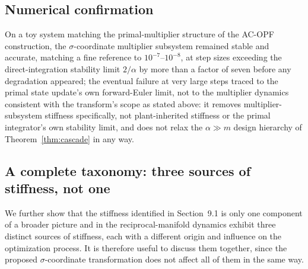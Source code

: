 \documentclass[11pt,onecolumn]{article}
\theoremstyle{definition}
\theoremstyle{remark}
\begin{document}
\subsection{Numerical confirmation}
On a toy system matching the primal-multiplier structure of the AC-OPF construction, the
$\sigma$-coordinate multiplier subsystem remained stable and accurate, matching a fine
reference to $10^{-7}$--$10^{-8}$, at step sizes exceeding the direct-integration stability
limit $2/\alpha$ by more than a factor of seven before any degradation appeared; the eventual
failure at very large steps traced to the primal state update's own forward-Euler limit, not to
the multiplier dynamics consistent with the transform's scope as stated above: it removes
multiplier-subsystem stiffness specifically, not plant-inherited stiffness or the primal
integrator's own stability limit, and does not relax the $\alpha \gg m$ design hierarchy of
Theorem~\ref{thm:cascade} in any way.



\subsection{A complete taxonomy: three sources of stiffness, not one}


We further show that the stiffness identified in Section~9.1 is only one component of a broader picture and in  the reciprocal-manifold dynamics exhibit three distinct sources of stiffness, each with a different origin and influence on the optimization process. It is therefore useful to discuss them together, since the proposed $\sigma$-coordinate transformation does not affect all of them in the same way.
\end{document}
